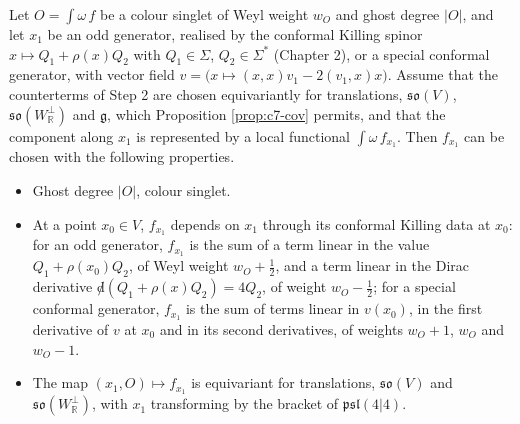 \begin{proposition}
\label{prop:c7-select}
Let $O=\int\omega\,f$ be a colour singlet of Weyl weight $w_O$ and ghost degree $|O|$, and let $x_1$ be an odd generator, realised by the conformal Killing spinor $x\mapsto Q_1+\rho(x)Q_2$ with $Q_1\in\Sigma$, $Q_2\in\Sigma^*$ (Chapter 2), or a special conformal generator, with vector field $v=\big(x\mapsto(x,x)v_1-2(v_1,x)x\big)$. Assume that the counterterms of Step 2 are chosen equivariantly for translations, $\mathfrak{so}(V)$, $\mathfrak{so}(W_{\mathbb R}^\perp)$ and $\mathfrak g$, which Proposition \ref{prop:c7-cov} permits, and that the component along $x_1$ is represented by a local functional $\int\omega\,f_{x_1}$. Then $f_{x_1}$ can be chosen with the following properties.
\begin{itemize}
\item Ghost degree $|O|$, colour singlet.
\item At a point $x_0\in V$, $f_{x_1}$ depends on $x_1$ through its conformal Killing data at $x_0$: for an odd generator, $f_{x_1}$ is the sum of a term linear in the value $Q_1+\rho(x_0)Q_2$, of Weyl weight $w_O+\tfrac12$, and a term linear in the Dirac derivative ${\not d}(Q_1+\rho(x)Q_2)=4Q_2$, of weight $w_O-\tfrac12$; for a special conformal generator, $f_{x_1}$ is the sum of terms linear in $v(x_0)$, in the first derivative of $v$ at $x_0$ and in its second derivatives, of weights $w_O+1$, $w_O$ and $w_O-1$.
\item The map $(x_1,O)\mapsto f_{x_1}$ is equivariant for translations, $\mathfrak{so}(V)$ and $\mathfrak{so}(W_{\mathbb R}^\perp)$, with $x_1$ transforming by the bracket of $\mathfrak{psl}(4|4)$.
\end{itemize}
\end{proposition}

